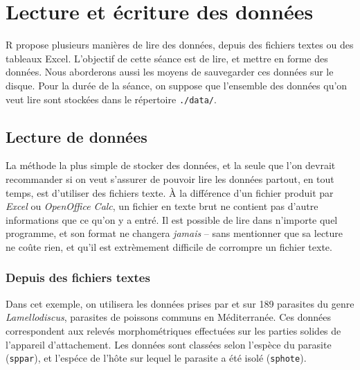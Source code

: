 \chapter{Lecture et écriture des données}

R propose plusieurs manières de lire des données, depuis des fichiers textes ou des tableaux Excel.
L'objectif de cette séance est de lire, et mettre en forme des données.
Nous aborderons aussi les moyens de sauvegarder ces données sur le disque.
Pour la durée de la séance, on suppose que l'ensemble des données qu'on veut lire sont stockées dans le répertoire \texttt{./data/}.

\section{Lecture de données}

La méthode la plus simple de stocker des données, et la seule que l'on devrait recommander si on veut s'assurer de pouvoir lire les données partout, en tout temps, est d'utiliser des fichiers texte.
À la différence d'un fichier produit par \emph{Excel} ou \emph{OpenOffice Calc}, un fichier en texte brut ne contient pas d'autre informations que ce qu'on y a entré.
Il est possible de lire dans n'importe quel programme, et son format ne changera \emph{jamais} -- sans mentionner que sa lecture ne coûte rien, et qu'il est extrèmement difficile de corrompre un fichier texte. 

\subsection{Depuis des fichiers textes}

Dans cet exemple, on utilisera les données prises par \textcite{Kaci-Chaouch2008} et \textcite{PoisotBJLS2010} sur 189 parasites du genre \emph{Lamellodiscus}, parasites de poissons communs en Méditerranée.
Ces données correspondent aux relevés morphométriques effectuées sur les parties solides de l'appareil d'attachement. Les données sont classées selon l'espèce du parasite (\texttt{sppar}), et l'espéce de l'hôte sur lequel le parasite a été isolé (\texttt{sphote}).

